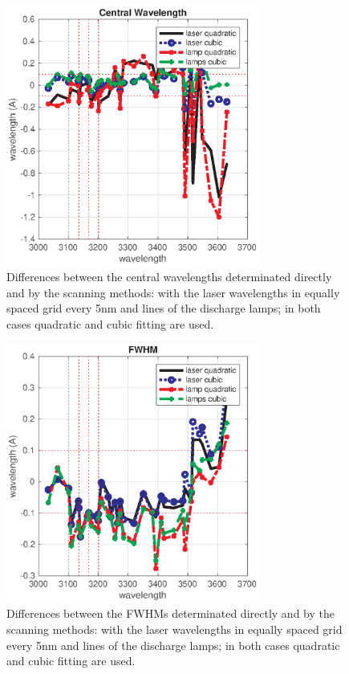 \documentclass[acp]{copernicus} %
\begin{document}
\clearpage
\begin{figure}[t]
\includegraphics[width=8.3cm]{figures/General_central_comparison.eps}
\caption{Differences between the central wavelengths determinated directly and by the scanning methods: with the laser wavelengths in equally spaced grid every 5nm and lines of the discharge lamps; in both cases quadratic and cubic fitting are used.}
\label{fig:cw_comp}
\end{figure}


 \clearpage
\begin{figure}[t]
\includegraphics[width=8.3cm]{figures/General_fwhm_comparison.eps}
\caption{Differences between the FWHMs determinated directly and by the scanning methods: with the laser wavelengths in equally spaced grid every 5nm and lines of the discharge lamps; in both cases quadratic and cubic fitting are used.}
\label{fig:fwhm_comp}
\end{figure}
\end{document}
